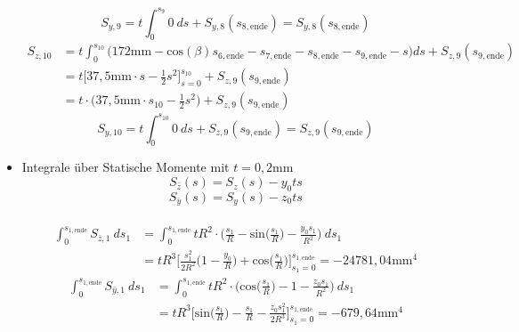 \begin{itemize}
\begin{equation}
	S_{y,9} = t\int_{0}^{s_9}0\ ds + S_{y,8}(s_{8,\mathrm{ende}}) = S_{y,8}(s_{8,\mathrm{ende}})
\end{equation}
\begin{equation}
	\begin{split}
		S_{z,10} &= t\int_{0}^{s_{10}}\bigg(172\mathrm{mm}-\mathrm{cos}(\beta)s_{6,\mathrm{ende}}-s_{7,\mathrm{ende}}-s_{8,\mathrm{ende}}-s_{9,\mathrm{ende}}-s\bigg)ds + S_{z,9}(s_{9,\mathrm{ende}})\\\
		&= t\bigg[37,5\mathrm{mm}\cdot s - \frac{1}{2}s^2\bigg]_{s=0}^{s_{10}} + S_{z,9}(s_{9,\mathrm{ende}})\\\
		&= t\cdot\bigg(37,5\mathrm{mm}\cdot s_{10} - \frac{1}{2}s^2\bigg) + S_{z,9}(s_{9,\mathrm{ende}})
	\end{split}
\end{equation}
\begin{equation}
	S_{y,10} = t\int_{0}^{s_{10}}0\ ds + S_{z,9}(s_{9,\mathrm{ende}}) = S_{z,9}(s_{9,\mathrm{ende}})
\end{equation}
	\item Integrale über Statische Momente mit $t=0,2$mm
	\begin{equation}
		S_{\bar z}(s) = S_z(s) - y_0ts
	\end{equation}
	\begin{equation}
		S_{\bar y}(s) = S_y(s) - z_0ts
	\end{equation}
~\\%
	\begin{equation}
		\begin{split}
			\int_{0}^{s_{1,\mathrm{ende}}} S_{\bar z,1}\ ds_1 &= \int_{0}^{s_{1,\mathrm{ende}}}  tR^2\cdot\bigg(\frac{s_1}{R}-\mathrm{sin}\bigg(\frac{s_1}{R}\bigg)-\frac{y_0s_1}{R^2}\bigg)\ ds_1\\\
			&=tR^3\bigg[\frac{s_1^2}{2R^2}\bigg(1-\frac{y_0}{R}\bigg)+\mathrm{cos}\bigg(\frac{s_1}{R}\bigg)\bigg]_{s_1=0}^{s_{1,\mathrm{ende}}} = -24781,04\mathrm{mm}^4
		\end{split}
	\end{equation}
	\begin{equation}
		\begin{split}
			\int_{0}^{s_{1,\mathrm{ende}}} S_{\bar y,1}\ ds_1 &= \int_{0}^{s_{1,\mathrm{ende}}} tR^2 \cdot\bigg(\mathrm{cos}\bigg(\frac{s_1}{R}\bigg)-1 - \frac{z_0s_1}{R^2}\bigg)\ ds_1\\\
			&=tR^3\bigg[\mathrm{sin}\bigg(\frac{s_1}{R}\bigg) -\frac{s_1}{R} - \frac{z_0s_1^2}{2R^3}\bigg]_{s_1=0}^{s_{1,\mathrm{ende}}} = -679,64\mathrm{mm}^4

\end{split}
\end{equation}
\end{itemize}
